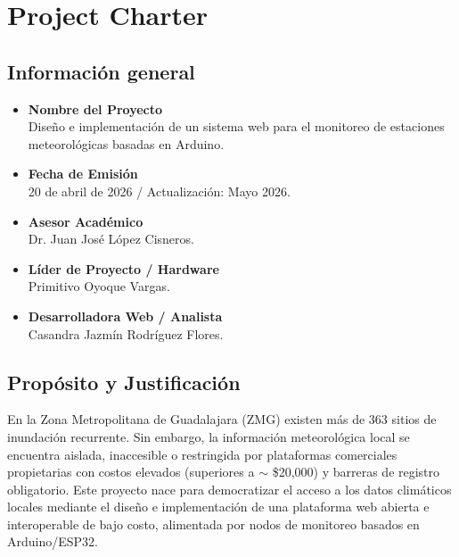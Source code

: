 \section{Project Charter}

\subsection{Información general}
\begin{itemize}
    \item \textbf{Nombre del Proyecto}\\
    Diseño e implementación de un sistema web para el monitoreo de estaciones meteorológicas basadas en Arduino.

    \item \textbf{Fecha de Emisión}\\
    20 de abril de 2026 / Actualización: Mayo 2026.

    \item \textbf{Asesor Académico}\\
    Dr. Juan José López Cisneros. 

    \item \textbf{Líder de Proyecto / Hardware}\\
    Primitivo Oyoque Vargas. 

    \item \textbf{Desarrolladora Web / Analista}\\
    Casandra Jazmín Rodríguez Flores.
\end{itemize}

\subsection{Propósito y Justificación}

En la Zona Metropolitana de Guadalajara (ZMG) existen más de 363 sitios de inundación recurrente. Sin embargo, la información meteorológica local se encuentra aislada, inaccesible o restringida por plataformas comerciales propietarias con costos elevados (superiores a $\sim$ \$20,000) y barreras de registro obligatorio. 
Este proyecto nace para democratizar el acceso a los datos climáticos locales mediante el diseño e implementación de una plataforma web abierta e interoperable de bajo costo, alimentada por nodos de monitoreo basados en Arduino/ESP32. 

